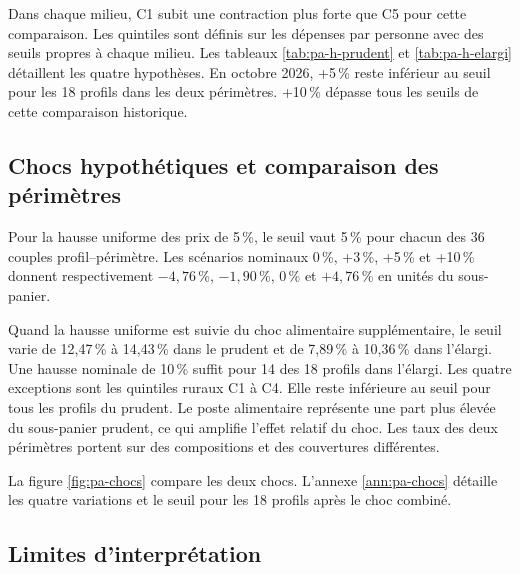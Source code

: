 Dans chaque milieu, C1 subit une contraction plus forte que C5 pour cette comparaison. Les quintiles sont définis sur les dépenses par personne avec des seuils propres à chaque milieu. Les tableaux \ref{tab:pa-h-prudent} et \ref{tab:pa-h-elargi} détaillent les quatre hypothèses. En octobre 2026, +5\,\% reste inférieur au seuil pour les 18 profils dans les deux périmètres. +10\,\% dépasse tous les seuils de cette comparaison historique.
\clearpage


\clearpage

\subsection{Chocs hypothétiques et comparaison des périmètres}

Pour la hausse uniforme des prix de 5\,\%, le seuil vaut 5\,\% pour chacun des 36 couples profil--périmètre. Les scénarios nominaux 0\,\%, +3\,\%, +5\,\% et +10\,\% donnent respectivement $-4{,}76$\,\%, $-1{,}90$\,\%, 0\,\% et $+4{,}76$\,\% en unités du sous-panier.

Quand la hausse uniforme est suivie du choc alimentaire supplémentaire, le seuil varie de 12,47\,\% à 14,43\,\% dans le prudent et de 7,89\,\% à 10,36\,\% dans l'élargi. Une hausse nominale de 10\,\% suffit pour 14 des 18 profils dans l'élargi. Les quatre exceptions sont les quintiles ruraux C1 à C4. Elle reste inférieure au seuil pour tous les profils du prudent. Le poste alimentaire représente une part plus élevée du sous-panier prudent, ce qui amplifie l'effet relatif du choc. Les taux des deux périmètres portent sur des compositions et des couvertures différentes.

La figure \ref{fig:pa-chocs} compare les deux chocs. L'annexe \ref{ann:pa-chocs} détaille les quatre variations et le seuil pour les 18 profils après le choc combiné.
\clearpage

\subsection{Limites d'interprétation}

